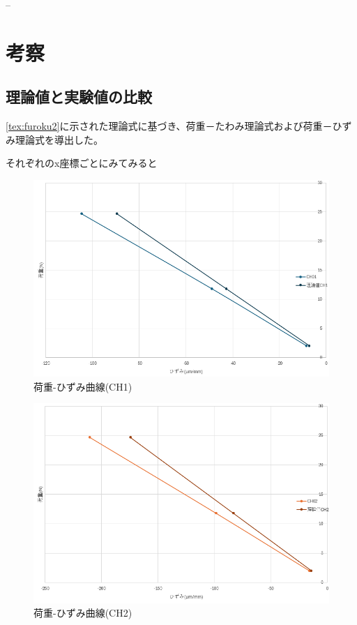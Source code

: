 \documentclass[a4j]{jarticle}
\begin{document}
--

\section{考察}

\subsection{理論値と実験値の比較}
\ref{tex:furoku2}に示された理論式に基づき、荷重－たわみ理論式および荷重－ひずみ理論式を導出した。

それぞれのx座標ごとにみてみると

\begin{figure}[H]
    \centering
    \includegraphics[width=0.8\linewidth]{summer/ship-experiment/bend/picture/ch1.png}
    \caption{荷重-ひずみ曲線(CH1)}
    \label{fig:ch1}
\end{figure}

\begin{figure}[H]
    \centering
    \includegraphics[width=0.8\linewidth]{summer/ship-experiment/bend/picture/ch2.png}
    \caption{荷重-ひずみ曲線(CH2)}
    \label{fig:ch2}
\end{figure}
\end{document}
